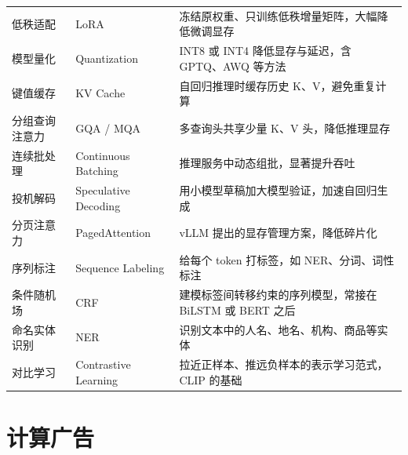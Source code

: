 \begin{xltabular}{\textwidth}{L{3.0cm} L{3.6cm} Y}
低秩适配 & LoRA & 冻结原权重、只训练低秩增量矩阵，大幅降低微调显存 \\
模型量化 & Quantization & INT8 或 INT4 降低显存与延迟，含 GPTQ、AWQ 等方法 \\
键值缓存 & KV Cache & 自回归推理时缓存历史 K、V，避免重复计算 \\
分组查询注意力 & GQA / MQA & 多查询头共享少量 K、V 头，降低推理显存 \\
连续批处理 & Continuous Batching & 推理服务中动态组批，显著提升吞吐 \\
投机解码 & Speculative Decoding & 用小模型草稿加大模型验证，加速自回归生成 \\
分页注意力 & PagedAttention & vLLM 提出的显存管理方案，降低碎片化 \\
序列标注 & Sequence Labeling & 给每个 token 打标签，如 NER、分词、词性标注 \\
条件随机场 & CRF & 建模标签间转移约束的序列模型，常接在 BiLSTM 或 BERT 之后 \\
命名实体识别 & NER & 识别文本中的人名、地名、机构、商品等实体 \\
对比学习 & Contrastive Learning & 拉近正样本、推远负样本的表示学习范式，CLIP 的基础 \\
\end{xltabular}

\section{计算广告}

